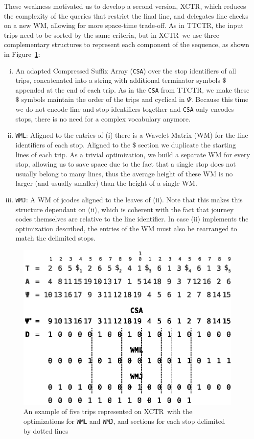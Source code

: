 \documentclass[runningheads]{llncs}
\newcommand{\ctr}{XCTR}
\newcommand{\ttctr}{TTCTR}
\begin{document}
These weakness motivated us to develop a second version, \ctr, which reduces the complexity of the queries that restrict the final line, and delegates line checks on a new WM, allowing for more space-time trade-off. As in \ttctr, the input trips need to be sorted by the same criteria, but in \ctr~we use three complementary structures to represent each component of the sequence, as shown in Figure~\ref{fig:example_xctr}:
\begin{enumerate}[(i)]
    \item An adapted Compressed Suffix Array (\texttt{CSA}) over the stop identifiers of all trips, concatenated into a string with additional terminator symbols $\$$ appended at the end of each trip. As in the \texttt{CSA} from \ttctr, we make these $\$$ symbols maintain the order of the trips and cyclical in $\Psi$. Because this time we do not encode line and stop identifiers together and \texttt{CSA} only encodes stops, there is no need for a complex vocabulary anymore.
    \item \texttt{WML}: Aligned to the entries of (i) there is a Wavelet Matrix (WM) for the line identifiers of each stop. Aligned to the $\$$ section we duplicate the starting lines of each trip. As a trivial optimization, we build a separate WM for every stop, allowing us to save space due to the fact that a single stop does not usually belong to many lines, thus the average height of these WM is no larger (and usually smaller) than the height of a single WM.
    \item \texttt{WMJ}: A WM of jcodes aligned to the leaves of (ii). Note that this makes this structure dependant on (ii), which is coherent with the fact that journey codes themselves are relative to the line identifier. In case (ii) implements the optimization described, the entries of the WM must also be rearranged to match the delimited stops.
\end{enumerate}

\begin{figure}[hbt!]
\includegraphics[width=\textwidth]{example_xctr.eps}
\caption{An example of five trips represented on \ctr~with the optimizations for \texttt{WML} and \texttt{WMJ}, and sections for each stop delimited by dotted lines}
\label{fig:example_xctr}
\end{figure}
\end{document}
